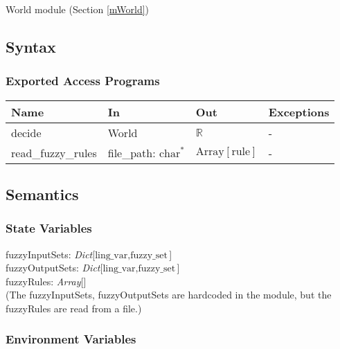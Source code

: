\documentclass[12pt, titlepage]{article}
\begin{document}
World module (Section \ref{mWorld})

\subsection{Syntax}


\subsubsection{Exported Access Programs}

\begin{center}
\begin{tabular}{p{3cm} p{4cm} p{3cm} p{2cm}}
\hline
\textbf{Name} & \textbf{In} & \textbf{Out} & \textbf{Exceptions} \\
\hline
decide & World & $\mathbb{R}$ & - \\
read\_fuzzy\_rules & file\_path: $\text{char}^*$ & $\text{Array}[\text{rule}]$ & - \\
\hline
\end{tabular}
\end{center}

\subsection{Semantics}

\subsubsection{State Variables}

fuzzyInputSets: \textit{Dict}[$\text{ling\_var}, \text{fuzzy\_set}$] \\
fuzzyOutputSets: \textit{Dict}[$\text{ling\_var}, \text{fuzzy\_set}$] \\
fuzzyRules: \textit{Array}[] \\
(The fuzzyInputSets, fuzzyOutputSets are hardcoded in the module,
but the fuzzyRules are read from a file.)


\subsubsection{Environment Variables}
\end{document}

